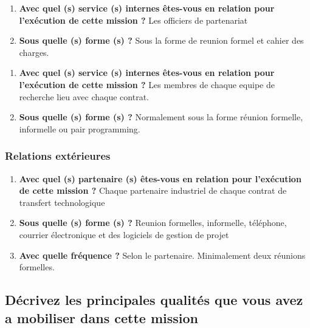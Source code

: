 \documentclass{resume} %
\begin{document}
	 \begin{enumerate} 
		\item \textbf{ Avec quel (s) service (s) internes êtes-vous en relation pour l'exécution de cette mission ?}
			Les officiers de partenariat  
		\item \textbf{Sous quelle (s) forme (s) ?}
			Sous la forme de reunion formel et cahier des charges. 
	\end {enumerate}
	 \begin{enumerate} 
		\item \textbf{ Avec quel (s) service (s) internes êtes-vous en relation pour l'exécution de cette mission ?}
			Les membres de chaque equipe de recherche lieu avec chaque contrat.
		\item \textbf{Sous quelle (s) forme (s) ?}
			Normalement sous la forme réunion formelle, informelle ou pair programming. 
	\end {enumerate}	

	\subsubsection {Relations extérieures}
		 \begin{enumerate} 
		\item \textbf{Avec quel (s) partenaire (s) êtes-vous en relation pour l'exécution de cette mission ?}
			Chaque partenaire industriel de chaque contrat de transfert technologique 
		\item \textbf{ Sous quelle (s) forme (s) ?}
			Reunion formelles, informelle, téléphone, courrier électronique et des logiciels de gestion de projet
		\item \textbf{ Avec quelle fréquence ?}
			Selon le partenaire. Minimalement deux réunions formelles. 
		\end {enumerate}			


	\subsection{Décrivez les principales qualités que vous avez a mobiliser dans cette mission}
\end{document}

